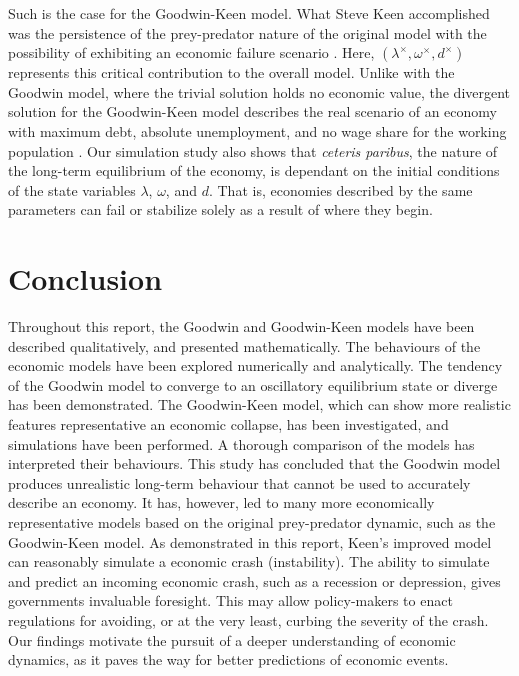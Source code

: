 \documentclass[12pt, centerh1]{article}
\begin{document}
Such is the case for the Goodwin-Keen model. What Steve Keen accomplished was the persistence of the prey-predator nature of the original model with the possibility of exhibiting an economic failure scenario \citep{keen1995finance}. Here, $(\lambda^\times, \omega^\times, d^\times)$ represents this critical contribution to the overall model. Unlike with the Goodwin model, where the trivial solution holds no economic value, the divergent solution for the Goodwin-Keen model describes the real scenario of an economy with maximum debt, absolute unemployment, and no wage share for the working population \citep{minsky1992financial}. Our simulation study also shows that \emph{ceteris paribus}, the nature of the long-term equilibrium of the economy, is dependant on the initial conditions of the state variables $\lambda$, $\omega$, and $d$. That is, economies described by the same parameters can fail or stabilize solely as a result of where they begin.


\section{Conclusion}
Throughout this report, the Goodwin and Goodwin-Keen models have been described qualitatively, and presented mathematically. The behaviours of the economic models have been explored numerically and analytically. The tendency of the Goodwin model to converge to an oscillatory equilibrium state or diverge has been demonstrated. The Goodwin-Keen model, which can show more realistic features representative an economic collapse, has been investigated, and simulations have been performed. A thorough comparison of the models has interpreted their behaviours. This study has concluded that the Goodwin model produces unrealistic long-term behaviour that cannot be used to accurately describe an economy. It has, however, led to many more economically representative models based on the original prey-predator dynamic, such as the Goodwin-Keen model. As demonstrated in this report, Keen's improved model can reasonably simulate a economic crash (instability). The ability to simulate and predict an incoming economic crash, such as a recession or depression, gives governments invaluable foresight. This may allow policy-makers to enact regulations for avoiding, or at the very least, curbing the severity of the crash. Our findings motivate the pursuit of a deeper understanding of economic dynamics, as it paves the way for better predictions of economic events.
\end{document}
